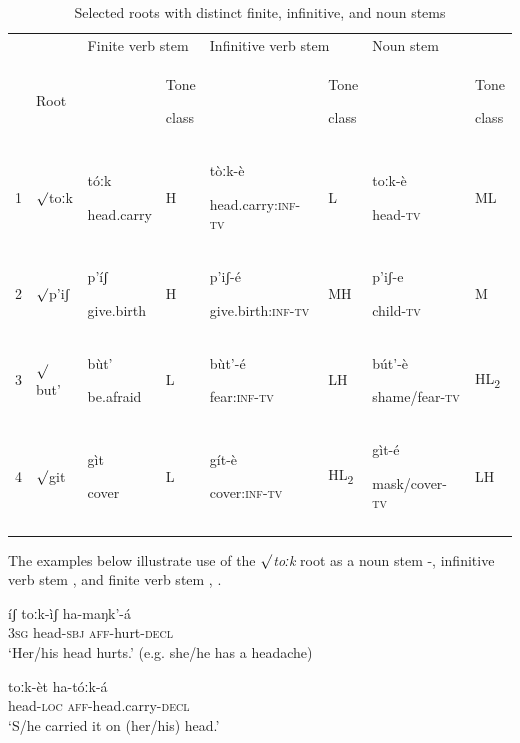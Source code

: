 \documentclass[output=paper]{langsci/langscibook}
\begin{document}
\begin{table}
\caption{Selected roots with distinct finite, infinitive, and noun stems}
\label{tab:mahland:3}
\begin{tabularx}{\textwidth}{XXXXXXXX} &  & \multicolumn{2}{X}{ Finite verb stem} & \multicolumn{2}{X}{ Infinitive verb stem} & \multicolumn{2}{X}{ Noun stem}\\
\lsptoprule
& Root &  & \multicolumn{1}{X}{Tone 

class} &  & \multicolumn{1}{X}{Tone 

class} &  & Tone 

class\\
1 & ${\surd}$toːk & tóːk

head.carry & H & tòːk-è

head.carry\textsc{:inf-tv} & L & toːk-è

head\textsc{{}-tv} & ML\\
2 & ${\surd}$p'iʃ & p'íʃ

give.birth & H & p'iʃ-é

give.birth\textsc{:inf-tv} & MH & p'iʃ-e

child\textsc{{}-tv} & M\\
3 & ${\surd}$but' & bùt'

be.afraid & L & bùt'-é

fear\textsc{:inf-tv} & LH & bút'-è

shame/fear\textsc{{}-tv} & HL\textsubscript{2}\\
4 & ${\surd}$git & gìt

cover & L & gít-è

cover\textsc{:inf-tv} & HL\textsubscript{2} & gìt-é

mask/cover\textsc{{}-tv} & LH\\
\lspbottomrule
\end{tabularx}
\end{table}

The examples below illustrate use of the \textit{${\surd}$toːk} root as a noun stem -, infinitive verb stem , and finite verb stem , . 

\ea\label{ex:mahland:20}
íʃ     {\downstep}toːk-ìʃ       ha-maŋk'-á\\
\textsc{3sg}   head-\textsc{sbj}   \textsc{aff}{}-hurt-\textsc{decl} \\
\glt `Her/his head hurts.' (e.g. she/he has a headache)
\z

\ea\label{ex:mahland:21}
\gll toːk-èt       ha-tóːk-{\downstep}á\\
head-\textsc{loc}   \textsc{aff}{}-head.carry-\textsc{decl} \\
\glt `S/he carried it on (her/his) head.'
\z
\end{document}
